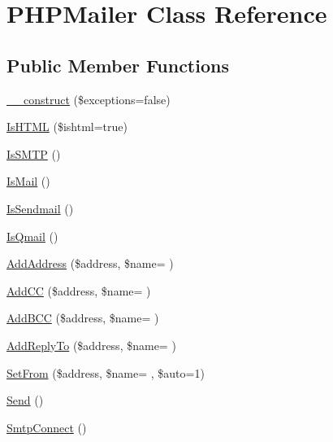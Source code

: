 \hypertarget{class_p_h_p_mailer}{}\section{P\+H\+P\+Mailer Class Reference}
\label{class_p_h_p_mailer}
\subsection*{Public Member Functions}
\begin{DoxyCompactItemize}
\item 
\hyperlink{class_p_h_p_mailer_a62add3bf4c4f2467b465d5de77cf1b48}{\+\_\+\+\_\+construct} (\$exceptions=false)
\item 
\hyperlink{class_p_h_p_mailer_a641607e353fdcf24aeb1ae9286ccdd99}{Is\+H\+T\+M\+L} (\$ishtml=true)
\item 
\hyperlink{class_p_h_p_mailer_a779c7b6c8baf387ec2ec5e1d26569d23}{Is\+S\+M\+T\+P} ()
\item 
\hyperlink{class_p_h_p_mailer_a6608e7a1a36c676f87c5632de8eaf163}{Is\+Mail} ()
\item 
\hyperlink{class_p_h_p_mailer_abbd675cd0375ed2206731081a94f308d}{Is\+Sendmail} ()
\item 
\hyperlink{class_p_h_p_mailer_a82353c7e98e468a4e6929e7beffda737}{Is\+Qmail} ()
\item 
\hyperlink{class_p_h_p_mailer_ab0bde1869952a77837f2d99564e3c6b9}{Add\+Address} (\$address, \$name= \textquotesingle{}\textquotesingle{})
\item 
\hyperlink{class_p_h_p_mailer_acd046ac389891b9373dd4321d61e3b1b}{Add\+C\+C} (\$address, \$name= \textquotesingle{}\textquotesingle{})
\item 
\hyperlink{class_p_h_p_mailer_aa8c8e2ff1ecad754f631b352f79e7e7d}{Add\+B\+C\+C} (\$address, \$name= \textquotesingle{}\textquotesingle{})
\item 
\hyperlink{class_p_h_p_mailer_ac22b1514962b271e0a1be4bd13616de3}{Add\+Reply\+To} (\$address, \$name= \textquotesingle{}\textquotesingle{})
\item 
\hyperlink{class_p_h_p_mailer_a85882aa27afb510bd57fa47bc155d1ef}{Set\+From} (\$address, \$name= \textquotesingle{}\textquotesingle{}, \$auto=1)
\item 
\hyperlink{class_p_h_p_mailer_acd2b73c81eddb1b4d0b51175ae1386c5}{Send} ()
\item 
\hyperlink{class_p_h_p_mailer_ac04fb0bc9607d5b8d85c554002fb2909}{Smtp\+Connect} ()
\item 

\end{DoxyCompactItemize}
